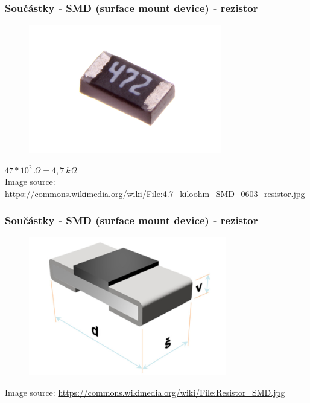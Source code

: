 \documentclass[12;pt,t]{beamer} %
\newcommand{\srctext}[1]{{\fontsize{7}{9}\selectfont\textcolor{sourcesclr}{#1}}}
\begin{document}
\begin{frame}
\frametitle{Součástky - SMD (surface mount device) - rezistor}    	
\begin{figure}[H]
	\includegraphics[width=0.75\textwidth]{img/4_7_kiloohm_SMD_0603_resistor.jpg}
\end{figure}
$47 * 10^2~\Omega = 4,7~k\Omega$\\ 
\srctext{Image source: \url{https://commons.wikimedia.org/wiki/File:4.7_kiloohm_SMD_0603_resistor.jpg}}
\end{frame}

\begin{frame}
\frametitle{Součástky - SMD (surface mount device) - rezistor}    	
\begin{figure}[H]
	\includegraphics[width=0.77\textwidth]{img/Resistor_SMD.jpg}
\end{figure}
\srctext{Image source: \url{https://commons.wikimedia.org/wiki/File:Resistor_SMD.jpg}}
\end{frame}
\end{document}
